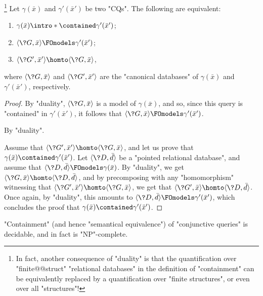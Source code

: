 \begin{proposition}
	\!\footnote{In fact, another consequence of "duality" is that
	the quantification over "finite@@struct" "relational databases"
	in the definition of "containment" can be equivalently replaced
	by a quantification over "finite structures", or even over all "structures"!}
	\AP\label{prop:containment-hom}
	Let $\gamma(\bar x)$ and $\gamma'(\bar x')$ be two "CQs".
	The following are equivalent:
	\begin{enumerate}
		\item $\gamma(\bar x) \intro*\contained \gamma'(\bar x')$;
		\item $\tup{\?G, \bar x} \FOmodels \gamma'(\bar x')$;
		\item $\tup{\?G', \bar x'} \homto \tup{\?G, \bar x}$,
	\end{enumerate}
	where $\tup{\?G, \bar x}$ and $\tup{\?G', \bar x'}$ are the "canonical databases"
	of $\gamma(\bar x)$ and $\gamma'(\bar x')$, respectively.
\end{proposition}

\begin{proof}
	By "duality", $\tup{\?G, \bar x}$ is a model of $\gamma(\bar x)$,
	and so, since this query is "contained" in $\gamma'(\bar x')$,
	it follows that $\tup{\?G, \bar x} \FOmodels \gamma'(\bar x')$.

	 By "duality".

	 Assume that
	$\tup{\?G', \bar x'} \homto \tup{\?G, \bar x}$,
	and let us prove that $\gamma(\bar x) \contained \gamma'(\bar x')$.
	Let $\tup{\?D, \bar d}$ be a "pointed relational database",
	and assume that $\tup{\?D, \bar d} \FOmodels \gamma(\bar x)$.
	By "duality", we get $\tup{\?G, \bar x} \homto \tup{\?D, \bar d}$,
	and by precomposing with any "homomorphism" witnessing
	that $\tup{\?G', \bar x'} \homto \tup{\?G, \bar x}$,
	we get that $\tup{\?G', \bar x} \homto \tup{\?D, \bar d}$.
	Once again, by "duality", this amounts to $\tup{\?D, \bar d} \FOmodels \gamma'(\bar x')$,
	which concludes the proof that $\gamma(\bar x) \contained \gamma'(\bar x')$.
\end{proof}

\begin{corollary}
	\label{coro:prelim-db-containment-cq}
	"Containment" (and hence "semantical equivalence") of "conjunctive queries" is
	decidable, and in fact is "NP"-complete.
\end{corollary}


